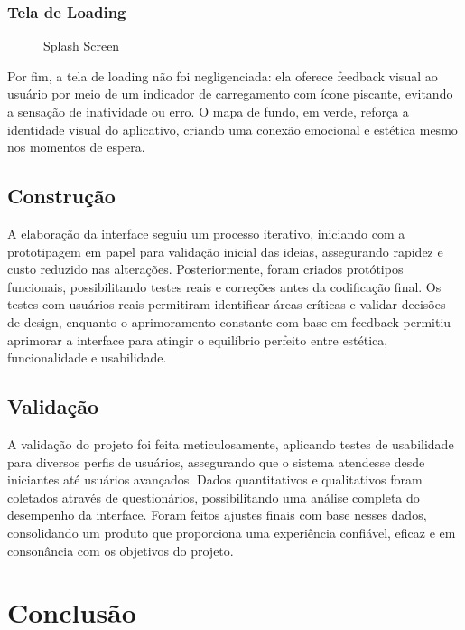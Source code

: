 \documentclass[a5paper, 12pt]{article}
\begin{document}
\subsubsection{Tela de Loading}

\begin{figure}[H]
  \centering
  \caption{Splash Screen}
  \label{fig:loading}
\end{figure}

Por fim, a tela de loading não foi negligenciada: ela oferece feedback visual ao usuário por meio de um indicador de carregamento com ícone piscante, evitando a sensação de inatividade ou erro. O mapa de fundo, em verde, reforça a identidade visual do aplicativo, criando uma conexão emocional e estética mesmo nos momentos de espera.

\subsection{Construção}

A elaboração da interface seguiu um processo iterativo, iniciando com a prototipagem em papel para validação inicial das ideias, assegurando rapidez e custo reduzido nas alterações. Posteriormente, foram criados protótipos funcionais, possibilitando testes reais e correções antes da codificação final. Os testes com usuários reais permitiram identificar áreas críticas e validar decisões de design, enquanto o aprimoramento constante com base em feedback permitiu aprimorar a interface para atingir o equilíbrio perfeito entre estética, funcionalidade e usabilidade.

\subsection{Validação}
A validação do projeto foi feita meticulosamente, aplicando testes de usabilidade para diversos perfis de usuários, assegurando que o sistema atendesse desde iniciantes até usuários avançados. Dados quantitativos e qualitativos foram coletados através de questionários, possibilitando uma análise completa do desempenho da interface. Foram feitos ajustes finais com base nesses dados, consolidando um produto que proporciona uma experiência confiável, eficaz e em consonância com os objetivos do projeto.

\newpage
\section{Conclusão}
\end{document}
